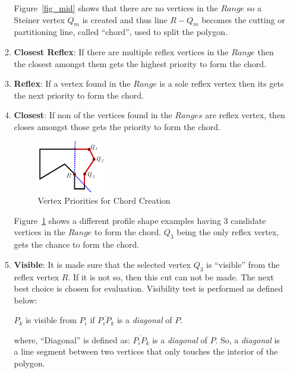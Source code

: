 \begin{enumerate}
\begin{enumerate}

Figure~\ref{fig_mid} shows that there are no vertices in the $Range$ so a Steiner vertex $Q_m$ is created and thus line $R-Q_m$ becomes the cutting or partitioning line, called ``chord'', used to split the polygon.

\item {\bf Closest Reflex}: If there are multiple reflex vertices in the $Range$ then the closest amongst them gets the highest priority to form the chord.

\item {\bf Reflex}: If a vertex found in the $Range$ is a sole reflex vertex then its gets the next priority to form the chord.

\item {\bf Closest}: If non of the vertices found in the $Ranges$ are reflex vertex, then closes amongst those gets the priority to form the chord.


\begin{figure}[h]
\centering \includegraphics[width=0.3\linewidth]{../Common/images/polydecomp_choice_1.pdf} 
\caption{Vertex Priorities for Chord Creation}
\label{fig_choice}
\end{figure}


Figure~\ref{fig_choice} shows a different profile shape examples having 3 candidate vertices in the $Range$ to form the chord. $Q_3$ being the only reflex vertex, gets the chance to form the chord.

\item {\bf Visible}: It is made sure that the selected vertex $Q_3$ is ``visible'' from the reflex vertex $R$. If it is not so, then this cut can not be made. The next best choice is chosen for evaluation. Visibility test is performed as defined below:

$P_k$ is visible from $P_i$ if $\overline{P_i P_k}$ is a {\em diagonal} of $P$. 

where, ``Diagonal'' is defined as: $\overline{P_i P_k}$ is a {\em diagonal} of $P$.  So, a {\em diagonal} is a line segment between two vertices that only touches the interior of the polygon.


\end{enumerate}
\end{enumerate}
